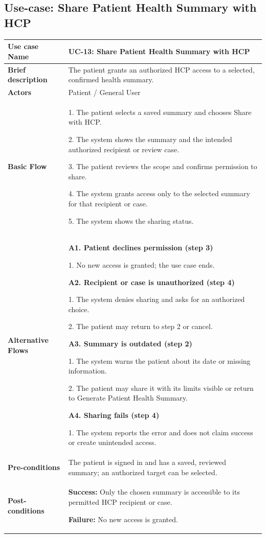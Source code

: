 \subsection{Use-case: Share Patient Health Summary with HCP}
\label{uc:uc-13}
\begin{longtable}{|p{}|p{}|}
\hline
\textbf{Use case Name} & UC-13: Share Patient Health Summary with HCP \\ \hline
\textbf{Brief description} & The patient grants an authorized HCP access to a selected, confirmed health summary. \\ \hline
\textbf{Actors} & Patient / General User \\ \hline
\textbf{Basic Flow} &
1. The patient selects a saved summary and chooses Share with HCP.\par
2. The system shows the summary and the intended authorized recipient or review case.\par
3. The patient reviews the scope and confirms permission to share.\par
4. The system grants access only to the selected summary for that recipient or case.\par
5. The system shows the sharing status.
\\ \hline
\textbf{Alternative Flows} &
\textbf{A1. Patient declines permission (step 3)}\par
1. No new access is granted; the use case ends.
\par\smallskip
\textbf{A2. Recipient or case is unauthorized (step 4)}\par
1. The system denies sharing and asks for an authorized choice.\par
2. The patient may return to step 2 or cancel.
\par\smallskip
\textbf{A3. Summary is outdated (step 2)}\par
1. The system warns the patient about its date or missing information.\par
2. The patient may share it with its limits visible or return to Generate Patient Health Summary.
\par\smallskip
\textbf{A4. Sharing fails (step 4)}\par
1. The system reports the error and does not claim success or create unintended access.
\\ \hline
\textbf{Pre-conditions} & The patient is signed in and has a saved, reviewed summary; an authorized target can be selected. \\ \hline
\textbf{Post-conditions} & \textbf{Success:} Only the chosen summary is accessible to its permitted HCP recipient or case.\par
\textbf{Failure:} No new access is granted. \\ \hline
\end{longtable}

